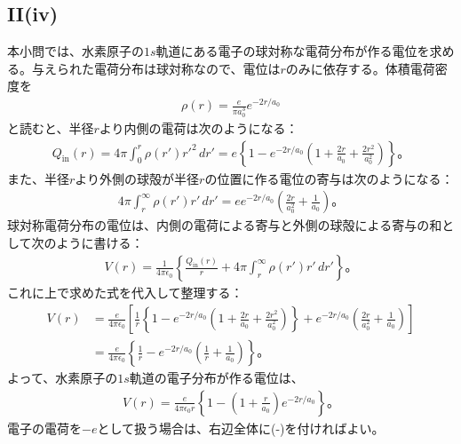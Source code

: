   \subsection*{II(iv)}
  本小問では、水素原子の$1s$軌道にある電子の球対称な電荷分布が作る電位を求める。与えられた電荷分布は球対称なので、電位は$r$のみに依存する。体積電荷密度を
  \begin{align*}
    \rho(r)=\frac{e}{\pi a_0^3}e^{-2r/a_0}
  \end{align*}
  と読むと、半径$r$より内側の電荷は次のようになる：
  \begin{align*}
    Q_{\mathrm{in}}(r)=4\pi\int_0^r\rho(r')r'^2\,dr'=e\left\{1-e^{-2r/a_0}\left(1+\frac{2r}{a_0}+\frac{2r^2}{a_0^2}\right)\right\}。
  \end{align*}
  また、半径$r$より外側の球殻が半径$r$の位置に作る電位の寄与は次のようになる：
  \begin{align*}
    4\pi\int_r^\infty \rho(r')r'\,dr'=e e^{-2r/a_0}\left(\frac{2r}{a_0^2}+\frac{1}{a_0}\right)。
  \end{align*}
  球対称電荷分布の電位は、内側の電荷による寄与と外側の球殻による寄与の和として次のように書ける：
  \begin{align*}
    V(r)=\frac{1}{4\pi\epsilon_0}\left\{\frac{Q_{\mathrm{in}}(r)}{r}+4\pi\int_r^\infty \rho(r')r'\,dr'\right\}。
  \end{align*}
  これに上で求めた式を代入して整理する：
  \begin{align*}
    V(r)
    &=\frac{e}{4\pi\epsilon_0}\left[\frac{1}{r}\left\{1-e^{-2r/a_0}\left(1+\frac{2r}{a_0}+\frac{2r^2}{a_0^2}\right)\right\}+e^{-2r/a_0}\left(\frac{2r}{a_0^2}+\frac{1}{a_0}\right)\right] \\
    &=\frac{e}{4\pi\epsilon_0}\left\{\frac{1}{r}-e^{-2r/a_0}\left(\frac{1}{r}+\frac{1}{a_0}\right)\right\}。
  \end{align*}
  よって、水素原子の$1s$軌道の電子分布が作る電位は、
  \begin{align*}
    V(r)=\frac{e}{4\pi\epsilon_0 r}\left\{1-\left(1+\frac{r}{a_0}\right)e^{-2r/a_0}\right\}。
  \end{align*}
  電子の電荷を$-e$として扱う場合は、右辺全体に(-)を付ければよい。
